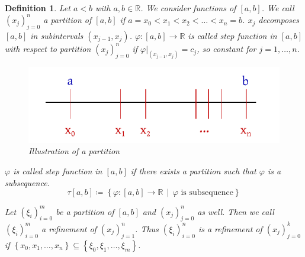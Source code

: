\documentclass{article}
\newtheorem{definition}{Definition}  \numberwithin{definition}{section}
\newcommand{\set}[1]{\left\{#1\right\}}
\newcommand{\setdef}[2]{\left\{\left.#1\,\middle|\,#2\right.\right\}}
\begin{document}
\begin{definition}
  Let $a < b$ with $a, b \in \mathbb R$. We consider functions of $[a,b]$.
  We call $(x_j)_{j = 0}^n$ a \emph{partition of $[a,b]$} if $a = x_0 < x_1 < x_2 < \dots < x_n = b$.
  $x_j$ decomposes $[a,b]$ in subintervals $(x_{j-1}, x_j)$.
  $\varphi: [a,b] \to \mathbb R$ is called \emph{step function in $[a,b]$ with respect to partition $(x_j)_{j=0}^n$}
  if $\varphi|_{(x_{j-1}, x_j)} = c_j$, so constant for $j=1,\dots,n$.

  \begin{figure}
    \begin{center}
      \includegraphics{img/09_subintervals.pdf}
      \caption{Illustration of a partition}
      \label{img:subintervals}
    \end{center}
  \end{figure}

  $\varphi$ is called \emph{step function in $[a,b]$} if there exists a partition such that $\varphi$ is a subsequence.
  \[ \tau[a,b] \coloneqq \setdef{\varphi: [a,b] \to \mathbb R}{\varphi \text{ is subsequence}} \]

  Let $(\xi_i)_{i=0}^m$ be a partition of $[a,b]$ and $(x_j)_{j=0}^n$ as well.
  Then we call $(\xi_i)_{i=0}^m$ a \emph{refinement} of $(x_j)_{j=1}^n$.
  Thus $(\xi_i)_{i=0}^n$ is a refinement of $(x_j)_{j=0}^k$ if
  $\set{x_0, x_1, \dots, x_n} \subseteq \set{\xi_0, \xi_1, \dots, \xi_m}$.


\end{definition}
\end{document}
